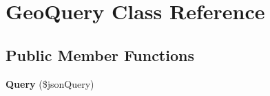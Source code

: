 \hypertarget{class_geo_query}{\section{Geo\+Query Class Reference}
\label{class_geo_query}
}
\subsection*{Public Member Functions}
\begin{DoxyCompactItemize}
\item 
\hypertarget{class_geo_query_a35df2e4f7ee64ed546246d33c7bfbce8}{{\bfseries Query} (\$json\+Query)}\label{class_geo_query_a35df2e4f7ee64ed546246d33c7bfbce8}

\end{DoxyCompactItemize}
